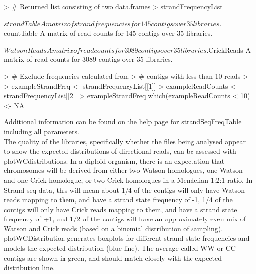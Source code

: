 \documentclass{article}
\begin{document}
\begin{Schunk}
\begin{Sinput}
> # Returned list consisting of two data.frames
> strandFrequencyList
\end{Sinput}
\begin{Soutput}
$strandTable
A matrix of strand frequencies for  145  contigs over  35  libraries.

$countTable
A matrix of read counts for  145  contigs over  35  libraries.

$WatsonReads
A matrix of read counts for  3089  contigs over  35  libraries.

$CrickReads
A matrix of read counts for  3089  contigs over  35  libraries.
\end{Soutput}
\begin{Sinput}
> # Exclude frequencies calculated from
> # contigs with less than 10 reads
> 
> exampleStrandFreq <- strandFrequencyList[[1]]
> exampleReadCounts <- strandFrequencyList[[2]]
> exampleStrandFreq[which(exampleReadCounts < 10)] <- NA 
\end{Sinput}
\end{Schunk}

Additional information can be found on the help page for strandSeqFreqTable including all parameters.\\

The quality of the libraries, specifically whether the files being analysed appear to show the expected distributions of directional reads, can be assessed with plotWCdistributions.  In a diploid organism, there is an expectation that chromosomes will be derived from either two Watson homologues, one Watson and one Crick homologue, or two Crick homologues in a Mendelian 1:2:1 ratio.  In Strand-seq data, this will mean about 1/4 of the contigs will only have Watson reads mapping to them, and have a strand state frequency of -1, 1/4 of the contigs will only have Crick reads mapping to them, and have a strand state frequency of +1, and 1/2 of the contigs will have an approximately even mix of Watson and Crick reads (based on a binomial distribution of sampling).  plotWCDistribution generates boxplots for different strand state frequencies and models the expected distribution (blue line). The average called WW or CC contigs are shown in green, and should match closely with the expected distribution line.
\end{document}
